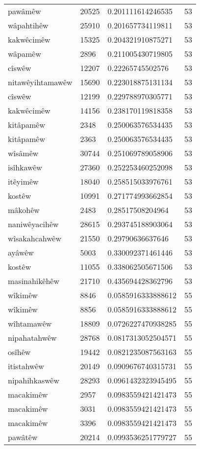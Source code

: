 \begin{longtable}{llll}
pawâmêw & 20525 & 0.201111614246535 & 53\\
wâpahtihêw & 25910 & 0.201657734119811 & 53\\
kakwêcimêw & 15325 & 0.204321910875271 & 53\\
wâpamêw & 2896 & 0.211005430719805 & 53\\
cîswêw & 12207 & 0.22265745502576 & 53\\
nitawêyihtamawêw & 15690 & 0.223018875131134 & 53\\
cîswêw & 12199 & 0.229788970305771 & 53\\
kakwêcimêw & 14156 & 0.238170119818358 & 53\\
kitâpamêw & 2348 & 0.250063576534435 & 53\\
kitâpamêw & 2363 & 0.250063576534435 & 53\\
wîsâmêw & 30744 & 0.251069789058906 & 53\\
isîhkawêw & 27360 & 0.252253460252098 & 53\\
itêyimêw & 18040 & 0.258515033976761 & 53\\
kostêw & 10991 & 0.271774993662854 & 53\\
mâkohêw & 2483 & 0.28517508204964 & 53\\
naniwêyacihêw & 28615 & 0.293745188903064 & 53\\
wîsakahcahwêw & 21550 & 0.29790636637646 & 53\\
ayâwêw & 5003 & 0.330092371461446 & 53\\
kostêw & 11055 & 0.338062505671506 & 53\\
masinahikêhêw & 21710 & 0.435694428362796 & 53\\
wîkimêw & 8846 & 0.0585916333888612 & 55\\
wîkimêw & 8856 & 0.0585916333888612 & 55\\
wîhtamawêw & 18809 & 0.0726227470938285 & 55\\
nipahatahwêw & 28768 & 0.0817313052504571 & 55\\
osîhêw & 19442 & 0.0821235087563163 & 55\\
itistahwêw & 20149 & 0.0909676740315731 & 55\\
nipahihkaswêw & 28293 & 0.0961432323945495 & 55\\
macakimêw & 2957 & 0.0983559421421473 & 55\\
macakimêw & 3031 & 0.0983559421421473 & 55\\
macakimêw & 3396 & 0.0983559421421473 & 55\\
pawâtêw & 20214 & 0.0993536251779727 & 55\\

\end{longtable}
